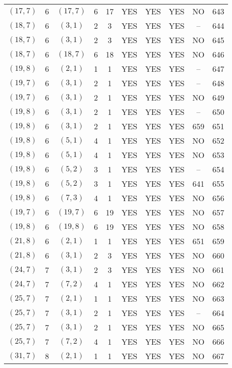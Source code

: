 \begin{longtable}{|c|c|c|c|c|c|c|c|c|c|}
$(17, 7)$ & 6 & $(17, 7)$ & 6 & 17 & YES & YES & YES & NO & 643\\
$(18, 7)$ & 6 & $(3, 1)$ & 2 & 3 & YES & YES & YES & -- & 644\\
$(18, 7)$ & 6 & $(3, 1)$ & 2 & 3 & YES & YES & YES & NO & 645\\
$(18, 7)$ & 6 & $(18, 7)$ & 6 & 18 & YES & YES & YES & NO & 646\\
$(19, 8)$ & 6 & $(2, 1)$ & 1 & 1 & YES & YES & YES & -- & 647\\
$(19, 7)$ & 6 & $(3, 1)$ & 2 & 1 & YES & YES & YES & -- & 648\\
$(19, 7)$ & 6 & $(3, 1)$ & 2 & 1 & YES & YES & YES & NO & 649\\
$(19, 8)$ & 6 & $(3, 1)$ & 2 & 1 & YES & YES & YES & -- & 650\\
$(19, 8)$ & 6 & $(3, 1)$ & 2 & 1 & YES & YES & YES & 659 & 651\\
$(19, 8)$ & 6 & $(5, 1)$ & 4 & 1 & YES & YES & YES & NO & 652\\
$(19, 8)$ & 6 & $(5, 1)$ & 4 & 1 & YES & YES & YES & NO & 653\\
$(19, 8)$ & 6 & $(5, 2)$ & 3 & 1 & YES & YES & YES & -- & 654\\
$(19, 8)$ & 6 & $(5, 2)$ & 3 & 1 & YES & YES & YES & 641 & 655\\
$(19, 8)$ & 6 & $(7, 3)$ & 4 & 1 & YES & YES & YES & NO & 656\\
$(19, 7)$ & 6 & $(19, 7)$ & 6 & 19 & YES & YES & YES & NO & 657\\
$(19, 8)$ & 6 & $(19, 8)$ & 6 & 19 & YES & YES & YES & NO & 658\\
$(21, 8)$ & 6 & $(2, 1)$ & 1 & 1 & YES & YES & YES & 651 & 659\\
$(21, 8)$ & 6 & $(3, 1)$ & 2 & 3 & YES & YES & YES & NO & 660\\
$(24, 7)$ & 7 & $(3, 1)$ & 2 & 3 & YES & YES & YES & NO & 661\\
$(24, 7)$ & 7 & $(7, 2)$ & 4 & 1 & YES & YES & YES & NO & 662\\
$(25, 7)$ & 7 & $(2, 1)$ & 1 & 1 & YES & YES & YES & NO & 663\\
$(25, 7)$ & 7 & $(3, 1)$ & 2 & 1 & YES & YES & YES & -- & 664\\
$(25, 7)$ & 7 & $(3, 1)$ & 2 & 1 & YES & YES & YES & NO & 665\\
$(25, 7)$ & 7 & $(7, 2)$ & 4 & 1 & YES & YES & YES & NO & 666\\
$(31, 7)$ & 8 & $(2, 1)$ & 1 & 1 & YES & YES & YES & NO & 667\\

\end{longtable}
